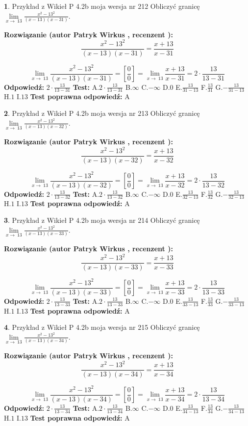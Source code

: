 \documentclass[12pt, a4paper]{article}
\theoremstyle{definition} %
\newtheorem{zad}{}
\newcommand{\zadStart}[1]{\begin{zad}#1\newline}
\newcommand{\zadStop}{\end{zad}}
\newcommand{\rozwStart}[2]{\noindent \textbf{Rozwiązanie (autor #1 , recenzent #2): }\newline}
\newcommand{\rozwStop}{\newline}
\newcommand{\odpStart}{\noindent \textbf{Odpowiedź:}\newline}
\newcommand{\odpStop}{\newline}
\newcommand{\testStart}{\noindent \textbf{Test:}\newline}
\newcommand{\testStop}{\newline}
\newcommand{\kluczStart}{\noindent \textbf{Test poprawna odpowiedź:}\newline}
\newcommand{\kluczStop}{\newline}
\begin{document}
\zadStart{Przykład z Wikieł P 4.2b moja wersja nr 212}
Obliczyć granicę $\lim\limits_{x\to\ 13}\frac{x^{2}-13^{2}}{(x-13)(x-31)}$.
\zadStop
\rozwStart{Patryk Wirkus}{}
$$\frac{x^{2}-13^{2}}{(x-13)(x-31)}=\frac{x+13}{x-31}$$

$$\lim\limits_{x\to\ 13}\frac{x^{2}-13^{2}}{(x-13)(x-31)}=[\frac{0}{0}]=\lim\limits_{x\to\ 13}\frac{x+13}{x-31}=2 \cdot \frac{13}{13-31}$$
\rozwStop
\odpStart
$2 \cdot \frac{13}{13-31}$
\odpStop
\testStart
A.$2 \cdot \frac{13}{13-31}$
B.$\infty$
C.$-\infty$
D.$0$
E.$\frac{13}{31-13}$
F.$\frac{13}{31}$
G.$-\frac{13}{31-13}$
H.$1$
I.$13$
\testStop
\kluczStart
A
\kluczStop



\zadStart{Przykład z Wikieł P 4.2b moja wersja nr 213}
Obliczyć granicę $\lim\limits_{x\to\ 13}\frac{x^{2}-13^{2}}{(x-13)(x-32)}$.
\zadStop
\rozwStart{Patryk Wirkus}{}
$$\frac{x^{2}-13^{2}}{(x-13)(x-32)}=\frac{x+13}{x-32}$$

$$\lim\limits_{x\to\ 13}\frac{x^{2}-13^{2}}{(x-13)(x-32)}=[\frac{0}{0}]=\lim\limits_{x\to\ 13}\frac{x+13}{x-32}=2 \cdot \frac{13}{13-32}$$
\rozwStop
\odpStart
$2 \cdot \frac{13}{13-32}$
\odpStop
\testStart
A.$2 \cdot \frac{13}{13-32}$
B.$\infty$
C.$-\infty$
D.$0$
E.$\frac{13}{32-13}$
F.$\frac{13}{32}$
G.$-\frac{13}{32-13}$
H.$1$
I.$13$
\testStop
\kluczStart
A
\kluczStop



\zadStart{Przykład z Wikieł P 4.2b moja wersja nr 214}
Obliczyć granicę $\lim\limits_{x\to\ 13}\frac{x^{2}-13^{2}}{(x-13)(x-33)}$.
\zadStop
\rozwStart{Patryk Wirkus}{}
$$\frac{x^{2}-13^{2}}{(x-13)(x-33)}=\frac{x+13}{x-33}$$

$$\lim\limits_{x\to\ 13}\frac{x^{2}-13^{2}}{(x-13)(x-33)}=[\frac{0}{0}]=\lim\limits_{x\to\ 13}\frac{x+13}{x-33}=2 \cdot \frac{13}{13-33}$$
\rozwStop
\odpStart
$2 \cdot \frac{13}{13-33}$
\odpStop
\testStart
A.$2 \cdot \frac{13}{13-33}$
B.$\infty$
C.$-\infty$
D.$0$
E.$\frac{13}{33-13}$
F.$\frac{13}{33}$
G.$-\frac{13}{33-13}$
H.$1$
I.$13$
\testStop
\kluczStart
A
\kluczStop



\zadStart{Przykład z Wikieł P 4.2b moja wersja nr 215}
Obliczyć granicę $\lim\limits_{x\to\ 13}\frac{x^{2}-13^{2}}{(x-13)(x-34)}$.
\zadStop
\rozwStart{Patryk Wirkus}{}
$$\frac{x^{2}-13^{2}}{(x-13)(x-34)}=\frac{x+13}{x-34}$$

$$\lim\limits_{x\to\ 13}\frac{x^{2}-13^{2}}{(x-13)(x-34)}=[\frac{0}{0}]=\lim\limits_{x\to\ 13}\frac{x+13}{x-34}=2 \cdot \frac{13}{13-34}$$
\rozwStop
\odpStart
$2 \cdot \frac{13}{13-34}$
\odpStop
\testStart
A.$2 \cdot \frac{13}{13-34}$
B.$\infty$
C.$-\infty$
D.$0$
E.$\frac{13}{34-13}$
F.$\frac{13}{34}$
G.$-\frac{13}{34-13}$
H.$1$
I.$13$
\testStop
\kluczStart
A
\kluczStop
\end{document}

